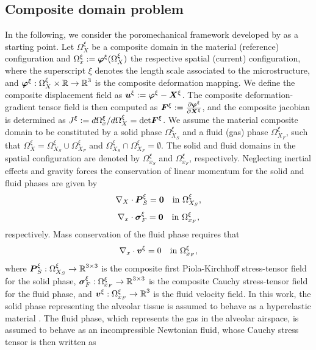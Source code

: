 \documentclass[preprint,3p,12pt,number,sort&compress]{elsarticle}
\newcommand{\pd}[2]{\frac{\partial #1}{ \partial #2}}   %
\def\vec   #1{\text{\boldmath $#1$}{}}
\def\ten   #1{\text{\boldmath $#1$}{}}
\def\R{\mbox{\(\mathbb{R}\)}}
\begin{document}
\subsection{Composite domain problem}
In the following, we consider the poromechanical framework developed by \citet{CollisEtAl2017} as a starting point. Let $\Omega_X^{\xi}$ be a composite domain in the material (reference) configuration and $\Omega_x^{\xi}:=\vec{\varphi}^{\xi} (\Omega_X^{\xi}) $ the respective spatial (current) configuration, where the superscript $\xi$ denotes the length scale associated to the microstructure, and $\vec \varphi^{\xi}:\Omega_X^{\xi} \times \R \to \R^3$ is the composite deformation mapping. We define the composite displacement field as $\vec{u}^{\xi}:=\vec{\varphi}^{\xi} -\vec {X}^{\xi}$. The composite deformation-gradient tensor field is then computed as $\ten{F}^{\xi}:=\pd{ \vec{\varphi}^{\xi}}{\vec{X}^{\xi}}$, and the composite jacobian is determined as $J^{\xi}:=d\Omega_x^{\xi}/d\Omega_X^{\xi}=\text{det} \ten{F}^{\xi}$. We assume the material composite domain to be constituted by a solid phase $\Omega_{X_S}^{\xi}$ and a fluid (gas) phase $\Omega_{X_F}^{\xi}$, such that $\Omega_{X}^{ \xi} = \Omega_{X_S}^{\xi} \cup \Omega_{X_F}^{\xi}$ and $\Omega_{X_S}^{\xi} \cap \Omega_{X_F}^{\xi } = \emptyset$. The solid and fluid domains in the spatial configuration are denoted by $\Omega_{x_S}^{\xi}$ and $\Omega_{x_F}^{\xi}$, respectively. Neglecting inertial effects and gravity forces the conservation of
linear momentum for the solid and fluid phases are given by
\begin{equation}
	\nabla_X \cdot \ten P_S^{\xi} = \vec 0 \quad \mbox{in } \Omega_{X_S}^{\xi}, \label{eqn:SolidEquilibrium}
\end{equation}
\begin{align}
	\nabla_x \cdot \ten {\sigma}_F^{\xi}  = \vec 0 \quad \mbox{in } \Omega_{x_F}^{\xi}, \label{eqn:FluidEquilibrium}
\end{align}
respectively. Mass conservation of the fluid phase requires that
\begin{equation}
	\nabla_x \cdot \vec v^{\xi} = 0 \quad \mbox{in } \Omega_{x_F}^{\xi}, \label{eqn:MassEquilibrium}
\end{equation}
where   $\ten P_S^{\xi}: \Omega_{X_S}^{\xi} \to \R^{3\times 3}$ is the composite first Piola-Kirchhoff stress-tensor field for the solid phase, $\ten {\sigma}^{\xi}_F: \Omega_{x_F}^{\xi} \to \R^{3\times 3}$ is the composite Cauchy stress-tensor field for the fluid phase, and $\vec{v}^{\xi}: \Omega_{x_F}^{\xi} \to \R^{3}$ is the fluid velocity field. In this work, the solid phase representing the alveolar tissue is assumed to behave as a hyperelastic material \cite{ConchaEtal2018}. The fluid phase, which represents the gas in the alveolar airspace, is assumed to behave as an incompressible Newtonian fluid, whose Cauchy stress tensor is then written as
\end{document}
